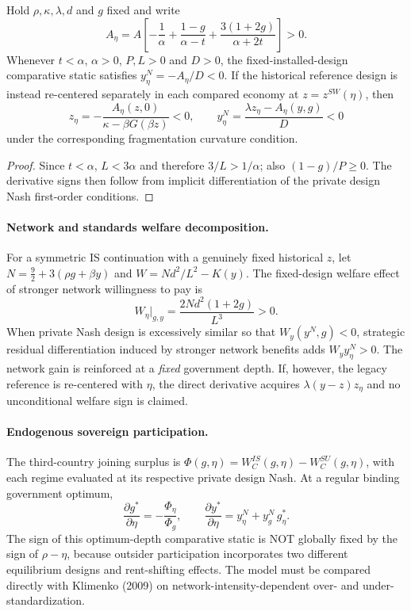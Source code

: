 \begin{proposition}
Hold $\rho,\kappa,\lambda,d$ and $g$ fixed and write
\[
 A_\eta=A\left[
 -\frac1\alpha+\frac{1-g}{\alpha-t}
 +\frac{3(1+2g)}{\alpha+2t}\right]>0.
\]
Whenever $t<\alpha$, $\alpha>0$, $P,L>0$ and $D>0$,
the fixed-installed-design comparative static satisfies
$y_\eta^N=-A_\eta/D<0$.
If the historical reference design is instead re-centered separately in
each compared economy at $z=z^{SW}(\eta)$, then
\[
 z_\eta=-\frac{A_\eta(z,0)}{\kappa-\beta G(\beta z)}<0,
 \qquad y_\eta^N=\frac{\lambda z_\eta-A_\eta(y,g)}{D}<0
\]
under the corresponding fragmentation curvature condition.
\end{proposition}
\begin{proof}
Since $t<\alpha$, $L<3\alpha$ and therefore
$3/L>1/\alpha$; also $(1-g)/P\ge0$.
The derivative signs then follow from implicit differentiation of the
private design Nash first-order conditions.
\end{proof}

\paragraph{Network and standards welfare decomposition.}
For a symmetric IS continuation with a genuinely fixed historical $z$,
let $N=\frac92+3(\rho g+\beta y)$ and
$W=N d^2/L^2-K(y)$. The fixed-design welfare effect of stronger network
willingness to pay is
\[
 W_\eta|_{g,y}=\frac{2Nd^2(1+2g)}{L^3}>0.
\]
When private Nash design is excessively similar so that
$W_y(y^N,g)<0$, strategic residual differentiation induced by stronger
network benefits adds $W_y y^N_\eta>0$. The network gain is reinforced
at a \emph{fixed} government depth. If, however, the legacy reference is
re-centered with $\eta$, the direct derivative acquires
$\lambda(y-z)z_\eta$ and no unconditional welfare sign is claimed.

\paragraph{Endogenous sovereign participation.}
The third-country joining surplus is
$\Phi(g,\eta)=W_C^{IS}(g,\eta)-W_C^{SU}(g,\eta)$, with each
regime evaluated at its respective private design Nash.
At a regular binding government optimum,
\[
 \frac{\partial g^*}{\partial\eta}
 =-\frac{\Phi_\eta}{\Phi_g},\qquad
 \frac{\partial y^*}{\partial\eta}
 =y^N_\eta+y^N_g\,g^*_\eta.
\]
The sign of this optimum-depth comparative static is NOT globally fixed
by the sign of $\rho-\eta$, because outsider participation incorporates
two different equilibrium designs and rent-shifting effects.
The model must be compared directly with Klimenko (2009) on
network-intensity-dependent over- and under-standardization.
